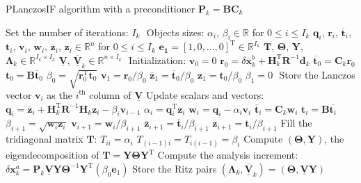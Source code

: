 \documentclass[12pt]{scrartcl}
\begin{document}
\begin{algorithm}[!ht]
\caption{PLanczosIF algorithm with a preconditioner $\mathbf{P}_k = \mathbf{B}\mathbf{C}_k$\label{algo:planczosif}}
\begin{algorithmic}
\STATE Set the number of iterations: $I_k$
\STATE $  $
\STATE Objects sizes:
\STATE $\alpha_i$, $\beta_i \in \mathbb{R}$ for $0 \le i \le I_k$
\STATE $\mathbf{q}_i$, $\mathbf{r}_i$, $\overline{\mathbf{t}}_i$, $\mathbf{t}_i$, $\mathbf{v}_i$, $\mathbf{w}_i$, $\overline{\mathbf{z}}_i$, $\mathbf{z}_i \in \mathbb{R}^n$ for $0 \le i \le I_k$
\STATE $\mathbf{e_1} = [1,0,\dots,0]^\mathrm{T} \in \mathbb{R}^{I_k}$
\STATE $\mathbf{T}$, $\boldsymbol{\Theta}$, $\mathbf{Y}$, $\boldsymbol{\Lambda}_k \in \mathbb{R}^{I_k \times I_k}$
\STATE $\underline{\mathbf{V}}$, $\underline{\overline{\mathbf{V}}}_k \in \mathbb{R}^{n \times I_k}$
\STATE $  $
\STATE Initialization:
\STATE $\mathbf{v}_0 = 0$
\STATE $\mathbf{r}_0 = \delta \overline{\mathbf{x}}^b_k + \mathbf{H}_k^\mathrm{T} \mathbf{R}^{-1} \mathbf{d}_k$
\STATE $\overline{\mathbf{t}}_0 = \mathbf{C}_k \mathbf{r}_0$
\STATE $\mathbf{t}_0 = \mathbf{B} \overline{\mathbf{t}}_0$
\STATE $\beta_0 = \sqrt{\mathbf{r}_0^\mathrm{T} \mathbf{t}_0}$
\STATE $\mathbf{v}_1 = \mathbf{r}_0/\beta_0$
\STATE $\overline{\mathbf{z}}_1 = \overline{\mathbf{t}}_0/\beta_0$
\STATE $\mathbf{z}_1 = \mathbf{t}_0/\beta_0$
\STATE $\beta_1 = 0$
\STATE $  $
\STATE Store the Lanczos vector $\mathbf{v}_i$ as the $i^\text{th}$ column of $\underline{\mathbf{V}}$
\STATE Update scalars and vectors:
\STATE $\mathbf{q}_i = \overline{\mathbf{z}}_i + \mathbf{H}_k^\mathrm{T} \mathbf{R}^{-1} \mathbf{H}_k \mathbf{z}_i - \beta_i \mathbf{v}_{i-1}$ 
\STATE $\alpha_i = \mathbf{q}_i^\mathrm{T} \mathbf{z}_i$
\STATE $\mathbf{w}_i = \mathbf{q}_i - \alpha_i \mathbf{v}_i$
\STATE $\overline{\mathbf{t}}_i = \mathbf{C}_k \mathbf{w}_i$
\STATE $\mathbf{t}_i = \mathbf{B} \overline{\mathbf{t}_i}$
\STATE $\beta_{i+1} = \sqrt{\mathbf{w}_i \mathbf{z}_i}$
\STATE $\mathbf{v}_{i+1} = \mathbf{w}_i/\beta_{i+1}$
\STATE $\overline{\mathbf{z}}_{i+1} = \overline{\mathbf{t}}_i/\beta_{i+1}$
\STATE $\mathbf{z}_{i+1} = \mathbf{t}_i/\beta_{i+1}$
\STATE Fill the tridiagonal matrix $\mathbf{T}$:
\STATE $T_{ii} = \alpha_i$
\STATE $T_{(i-1)i} = T_{i(i-1)} = \beta_i$
\ENDIF
\ENDFOR
\STATE Compute $\left(\boldsymbol{\Theta},\mathbf{Y}\right)$, the eigendecomposition of $\mathbf{T} = \mathbf{Y} \boldsymbol{\Theta} \mathbf{Y}^\mathrm{T}$
\STATE Compute the analysis increment: $\delta \mathbf{x}^a_k = \mathbf{P}_k \underline{\mathbf{V}} \mathbf{Y} \boldsymbol{\Theta}^{-1} \mathbf{Y}^\mathrm{T} \left(\beta_0 \mathbf{e}_1\right)$
\STATE Store the Ritz pairs $\left(\boldsymbol{\Lambda}_k,\underline{\overline{\mathbf{V}}}_k \right) = \left(\boldsymbol{\Theta},\underline{\mathbf{V}} \mathbf{Y}\right)$
\end{algorithmic}
\end{algorithm}
\end{document}

